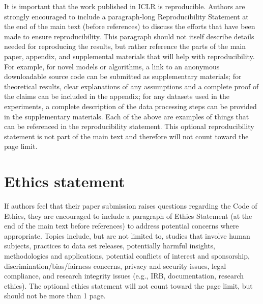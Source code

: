 \documentclass{article} %
\begin{document}
It is important that the work published in ICLR is reproducible. Authors are strongly encouraged to include a paragraph-long Reproducibility Statement at the end of the main text (before references) to discuss the efforts that have been made to ensure reproducibility. This paragraph should not itself describe details needed for reproducing the results, but rather reference the parts of the main paper, appendix, and supplemental materials that will help with reproducibility. For example, for novel models or algorithms, a link to an anonymous downloadable source code can be submitted as supplementary materials; for theoretical results, clear explanations of any assumptions and a complete proof of the claims can be included in the appendix; for any datasets used in the experiments, a complete description of the data processing steps can be provided in the supplementary materials. Each of the above are examples of things that can be referenced in the reproducibility statement. This optional reproducibility statement is not part of the main text and therefore will not count toward the page limit. 

\section*{Ethics statement}

 If authors feel that their paper submission raises questions regarding the Code of Ethics, they are encouraged to include a paragraph of Ethics Statement (at the end of the main text before references) to address potential concerns where appropriate. Topics include, but are not limited to, studies that involve human subjects, practices to data set releases, potentially harmful insights, methodologies and applications, potential conflicts of interest and sponsorship, discrimination/bias/fairness concerns, privacy and security issues, legal compliance, and research integrity issues (e.g., IRB, documentation, research ethics). The optional ethics statement will not count toward the page limit, but should not be more than 1 page.
\end{document}
